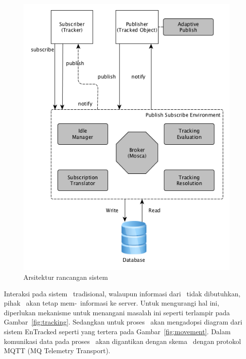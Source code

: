 
\noindent
\begin{figure}
  \centering
  \includegraphics[scale=0.60]
  {images/3-sistem}
  \caption{Arsitektur rancangan sistem}
\label{fig:sistem}
\end{figure}

Interaksi pada sistem \pubsub~tradisional, walaupun informasi dari \publisher~tidak
dibutuhkan, pihak \publisher~akan tetap mem-\publish~informasi ke server. Untuk
mengurangi hal ini, diperlukan mekanisme untuk menangani masalah ini seperti
terlampir pada Gambar~\ref{fig:tracking}. Sedangkan untuk proses \tracking~akan
mengadopsi diagram dari sistem EnTracked seperti yang tertera pada
Gambar~\ref{fig:movement}. Dalam komunikasi data pada proses \tracking~akan
digantikan dengan skema \pubsub~dengan protokol MQTT (MQ Telemetry Transport).


